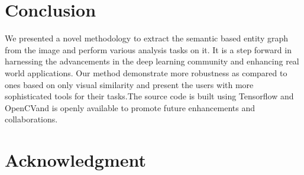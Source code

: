 \documentclass[conference]{IEEEtran}
\begin{document}
{%
%





\section{Conclusion}
We presented a novel methodology to extract the semantic based entity graph from the image and perform various analysis tasks on it. It is a step forward in harnessing the advancements in the deep learning community and enhancing real world applications. Our method demonstrate more robustness as compared to ones based on only visual similarity and present the users with more sophisticated tools for their tasks.The source code is built using Tensorflow \cite{tensorflow} and OpenCV\cite{opencv}and is openly available to promote future enhancements and collaborations.




\section*{Acknowledgment}


}
\end{document}
